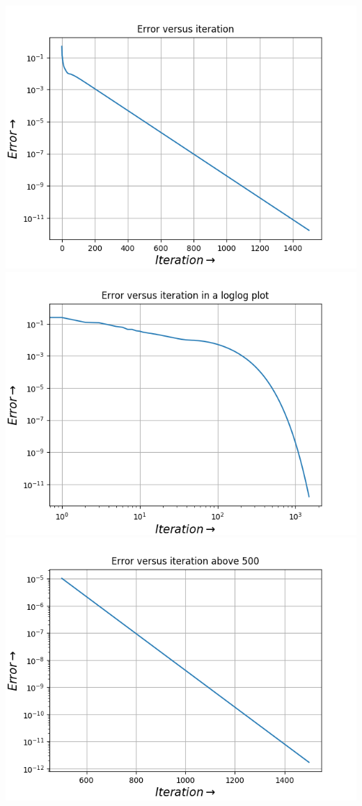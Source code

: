 \documentclass[11pt, a4paper]{article}
\begin{document}
    
     \includegraphics[scale=0.8]{Figure_2.png} 
     \includegraphics[scale=0.8]{Figure_3.png}  
     \includegraphics[scale=0.8]{Figure_4.png}  
\end{document}
